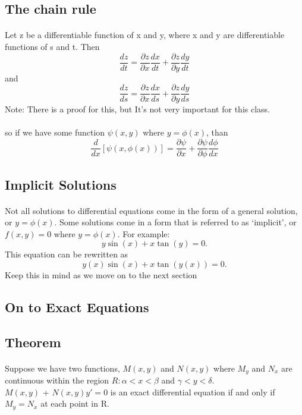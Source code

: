 \documentclass[font =22]{report}
\begin{document}
\subsection*{The chain rule}
\paragraph{}
Let z be a differentiable function of x and y, where x and y are differentiable functions of s and t. Then
\[
\frac{d z}{d t} = \frac{\partial z}{\partial x}\frac{dx}{dt}  + \frac{\partial z}{\partial y} \frac{dy}{dt}
\]
and
\[ 
\frac{d z}{d s} = \frac{\partial z}{\partial x}\frac{dx}{ds}  + \frac{\partial z}{\partial y} \frac{dy}{ds}
\]
Note: There is a proof for this, but It's not very important for this class. 
\\\\ 
so if we have some function $\psi(x,y)$ where $y=\phi(x)$,
than 
\[
\frac{d}{dx}[\psi(x,\phi(x))]= \frac{\partial \psi}{\partial x} + \frac{\partial \psi}{\partial \phi}\frac{d \phi}{dx}
\]

\subsection{Implicit Solutions}
\paragraph{}
Not all solutions to differential equations come in the form of a general solution, or  $y = \phi(x)$. Some solutions come in a form that is referred to as `implicit', or $f(x,y) = 0$ where $y=\phi(x)$. For example:
\[
y\sin(x) + x\tan(y) = 0.
\]
This equation can be rewritten as
\[
y(x)\sin(x) + x\tan(y(x)) = 0.
\]
Keep this in mind as we move on to the next section  

\subsection{On to Exact Equations}
\subsection*{Theorem}
\paragraph{}
Suppose we have two functions, $M(x,y)$ and $N(x,y)$ where $M_y$ and $N_x$ are continuous within the region $R:\alpha<x<\beta$ and $\gamma<y<\delta$.\\
$M(x,y)$ + $N(x,y)y' = 0$ is an exact differential equation if and only if $M_y=N_x$ at each point in R. 
\end{document}
